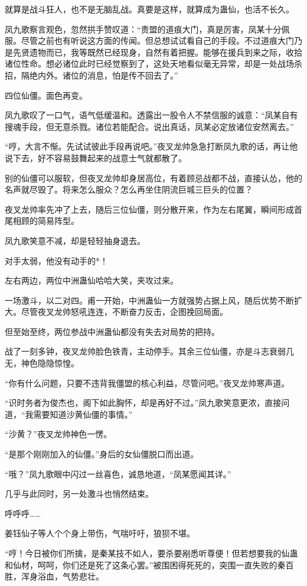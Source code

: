 \begin{this_body}
就算是战斗狂人，也不是无脑乱战。真要是这样，就算成为蛊仙，也活不长久。

凤九歌察言观色，忽然拱手赞叹道：“贵盟的道痕大门，真是厉害，凤某十分佩服。尽管之前也有听说这方面的传闻。但总想试试看自己的手段。不过道痕大门乃是先贤遗物而已，我等既然已经现身，自然有着把握。能够在援兵到来之际，收拾诸位性命。想必诸位此时已经觉察到了，这处天地看似毫无异常，却是一处战场杀招，隔绝内外。诸位的消息，怕是传不回去了。”

四位仙僵。面色再变。

凤九歌叹了一口气，语气低缓温和。透露出一股令人不禁信服的诚意：“凤某自有搜魂手段，但无意杀戮。诸位若能配合。说出真话，凤某必定放诸位安然离去。”

“哼，大言不惭。先试试彼此手段再说吧。”夜叉龙帅急急打断凤九歌的话，再让他说下去，好不容易鼓舞起来的战意士气就都散了。

别的仙僵可以服软，但夜叉龙帅却身居高位，有着顾忌战都不战，直接认怂，他的名声就尽毁了。将来怎么服众？怎么再坐住阴流巨城三巨头的位置？

夜叉龙帅率先冲了上去，随后三位仙僵，则分散开来，作为左右尾翼，瞬间形成首尾相顾的简易阵型。

凤九歌笑意不减，却是轻轻抽身退去。

对手太弱，他没有动手的*！

左右两边，两位中洲蛊仙哈哈大笑，夹攻过来。

一场激斗，以二对四。甫一开始，中洲蛊仙一方就强势占据上风，随后优势不断扩大。尽管夜叉龙帅怒吼连连，不断奋力反击，企图挽回局面。

但至始至终，两位参战中洲蛊仙都没有失去对局势的把持。

战了一刻多钟，夜叉龙帅脸色铁青，主动停手。其余三位仙僵，亦是斗志衰弱几无，神色隐隐惊惶。

“你有什么问题，只要不违背我僵盟的核心利益，尽管问吧。”夜叉龙帅寒声道。

“识时务者为俊杰也，阁下如此胸怀，却是再好不过。”凤九歌笑意更浓，直接问道，“我需要知道沙黄仙僵的事情。”

“沙黄？”夜叉龙帅神色一愣。

“是那个刚刚加入的仙僵。”身后的女仙僵脱口而出道。

“哦？”凤九歌眼中闪过一丝喜色，诚恳地道，“凤某愿闻其详。”

几乎与此同时，另一处激斗也悄然结束。

呼呼呼……

姜钰仙子等人个个身上带伤，气喘吁吁，狼狈不堪。

“哼！今日被你们所擒，是秦某技不如人，要杀要剐悉听尊便！但若想要我的仙蛊和仙材，呵呵，你们还是死了这条心罢。”被围困得死死的，突围一直失败的秦百胜，浑身浴血，气势悲壮。


\end{this_body}
